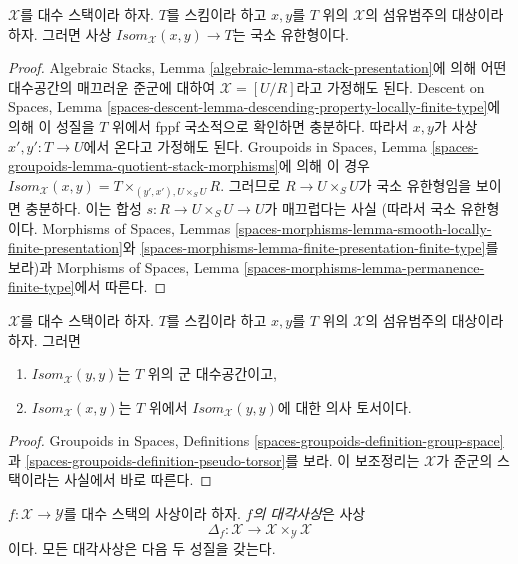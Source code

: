 \begin{lemma}
\label{lemma-isom-locally-finite-type}
$\mathcal{X}$를 대수 스택이라 하자. $T$를 스킴이라 하고
$x,y$를 $T$ 위의 $\mathcal{X}$의 섬유범주의 대상이라 하자.
그러면 사상
$\mathit{Isom}_\mathcal{X}(x, y) \to T$는 국소 유한형이다.
\end{lemma}

\begin{proof}
Algebraic Stacks, Lemma \ref{algebraic-lemma-stack-presentation}에 의해
어떤 대수공간의 매끄러운 준군에 대하여
$\mathcal{X} = [U/R]$라고 가정해도 된다.
Descent on Spaces, Lemma
\ref{spaces-descent-lemma-descending-property-locally-finite-type}에 의해
이 성질을 $T$ 위에서 fppf 국소적으로 확인하면 충분하다.
따라서 $x,y$가 사상 $x', y' : T \to U$에서 온다고 가정해도 된다.
Groupoids in Spaces, Lemma
\ref{spaces-groupoids-lemma-quotient-stack-morphisms}에 의해 이 경우
$\mathit{Isom}_\mathcal{X}(x, y) = T \times_{(y', x'), U \times_S U} R$.
그러므로 $R \to U \times_S U$가 국소 유한형임을 보이면 충분하다.
이는 합성 $s : R \to U \times_S U \to U$가 매끄럽다는 사실
(따라서 국소 유한형이다. Morphisms of Spaces, Lemmas
\ref{spaces-morphisms-lemma-smooth-locally-finite-presentation}와
\ref{spaces-morphisms-lemma-finite-presentation-finite-type}를 보라)과
Morphisms of Spaces, Lemma
\ref{spaces-morphisms-lemma-permanence-finite-type}에서 따른다.
\end{proof}

\begin{lemma}
\label{lemma-isom-pseudo-torsor-aut}
$\mathcal{X}$를 대수 스택이라 하자. $T$를 스킴이라 하고
$x,y$를 $T$ 위의 $\mathcal{X}$의 섬유범주의 대상이라 하자. 그러면
\begin{enumerate}
\item $\mathit{Isom}_\mathcal{X}(y, y)$는 $T$ 위의 군 대수공간이고,
\item $\mathit{Isom}_\mathcal{X}(x, y)$는 $T$ 위에서
$\mathit{Isom}_\mathcal{X}(y, y)$에 대한 의사 토서이다.
\end{enumerate}
\end{lemma}

\begin{proof}
Groupoids in Spaces, Definitions
\ref{spaces-groupoids-definition-group-space}과
\ref{spaces-groupoids-definition-pseudo-torsor}를 보라.
이 보조정리는 $\mathcal{X}$가 준군의 스택이라는 사실에서 바로 따른다.
\end{proof}

\noindent
$f : \mathcal{X} \to \mathcal{Y}$를 대수 스택의 사상이라 하자.
{\it $f$의 대각사상}은 사상
$$
\Delta_f :
\mathcal{X}
\longrightarrow
\mathcal{X} \times_\mathcal{Y} \mathcal{X}
$$
이다. 모든 대각사상은 다음 두 성질을 갖는다.

